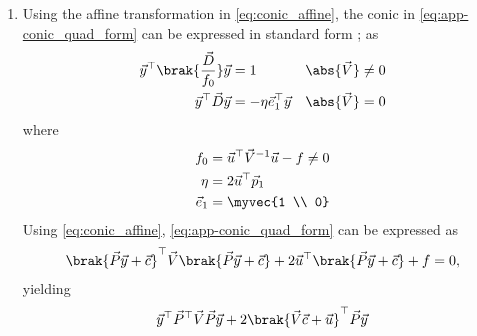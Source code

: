 \documentclass{article}
\numberwithin{equation}{section}
\numberwithin{figure}{section}
\begin{document}
\begin{enumerate}[label=\thesubsection.\arabic*.,ref=\thesubsection.\theenumi]
\begin{enumerate}
		\item ellipse for $\mydet{\vec{V}} > 0 $ and 
		\item hyperbola for $\mydet{\vec{V}} < 0 $. 
	\end{enumerate}
	\solution
  From \eqref{eq:app-conic_quad_form_e},
\begin{align}
  \frac{\lambda_1}{\lambda_2} = 1 - e^2
\end{align}
Also, 
\begin{align}
	\mydet{\vec{V}} =   \lambda_1\lambda_2 
\end{align}
	yielding .
\begin{table}[H]
\centering
\resizebox{\columnwidth}{!}{

	}
	\caption{}
\label{table:det}
\end{table}
			\item Using the affine transformation in
					\label{app:std-prm-P}
	\eqref{eq:conic_affine},
	the conic in     \eqref{eq:app-conic_quad_form} can be expressed in standard form 
	;%
	as
  \begin{align}
    \label{eq:app-conic_simp_temp_nonparab}
	    \vec{y}^{\top}\brak{\frac{\vec{D}}{f_0}}\vec{y} &= 1   &  \abs{\vec{V}} &\neq 0
    \\
	    \vec{y}^{\top}\vec{D}\vec{y} &=  -\eta\vec{e}_1^{\top}\vec{y}   & \abs{\vec{V}} &= 0
    \label{eq:app-conic_simp_temp_parab}
    \end{align}
    where
  \begin{align}
      \label{eq:app-f0}
	f_0 &=\vec{u}^{\top}\vec{V}^{-1}\vec{u} -f \neq 0
	  \\
      \label{eq:app-eta}
       \eta &=2\vec{u}^{\top}\vec{p}_1
       \\
       \vec{e}_1 &=\myvec{1 \\ 0}
      \end{align}
      \solution
  \label{app:parab}
	Using 
\eqref{eq:conic_affine},
\eqref{eq:app-conic_quad_form} can be expressed as
\begin{align}
\brak{\vec{P}\vec{y}+\vec{c}}^{\top}\vec{V}\brak{\vec{P}\vec{y}+\vec{c}}+2\vec{u}^{\top}\brak{\vec{P}\vec{y}+\vec{c}}+ f
	= 0, 
\end{align}
yielding 
\begin{align}
\vec{y}^{\top}\vec{P}^{\top}\vec{V}\vec{P}\vec{y}+2\brak{\vec{V}\vec{c}+\vec{u}}^{\top}\vec{P}\vec{y}

\end{align}
\end{enumerate}
\end{document}
